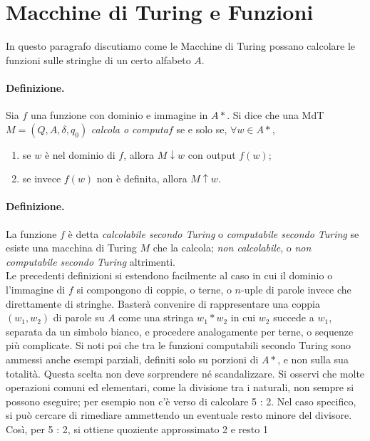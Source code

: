\section{Macchine di Turing e Funzioni}

In questo paragrafo discutiamo come le Macchine di Turing possano calcolare le
funzioni sulle stringhe di un certo alfabeto $A$.

\paragraph{Definizione.}
Sia $f$ una funzione con dominio e immagine in $A*$. Si dice che una
MdT $M = (Q, A, \delta, q_0)$ \textit{calcola o computa}$f$ se e solo se, $\forall w \in A*$,

\begin{enumerate}
    \item se $w$ è nel dominio di $f$, allora $M \downarrow w$ con output $f(w)$;
    \item se invece $f(w)$ non è definita, allora $M \uparrow w$.
\end{enumerate}

\paragraph{Definizione.}
La funzione $f$ è detta \textit{calcolabile secondo Turing} o
\textit{computabile secondo Turing} se esiste una macchina di Turing $M$ che la
calcola; \textit{non calcolabile},
o \textit{non computabile secondo Turing} altrimenti.\\

Le precedenti definizioni si estendono facilmente al caso in cui il dominio o
l'immagine di $f$ si compongono di coppie, o terne, o $n$-uple di parole invece che
direttamente di stringhe. Basterà convenire di rappresentare una coppia $(w_1, w_2)$
di parole su $A$ come una stringa $w_1* w_2$ in cui $w_2$ succede a $w_1$, separata
da un simbolo bianco, e procedere analogamente per terne, o sequenze più complicate.
Si noti poi che tra le funzioni computabili secondo Turing sono ammessi anche
esempi parziali, definiti solo su porzioni di $A*$, e non sulla sua totalità.
Questa scelta non deve sorprendere né scandalizzare. Si osservi che molte operazioni
comuni ed elementari, come la divisione tra i naturali, non sempre si possono
eseguire; per esempio non c'è verso di calcolare 5 : 2. Nel caso specifico, si può
cercare di rimediare ammettendo un eventuale resto minore del divisore. Così, per
5 : 2, si ottiene quoziente approssimato 2 e resto 1

